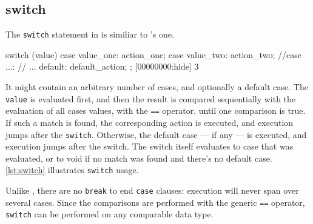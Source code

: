 \subsection{switch}

The \lstinline|switch| statement in \us is similiar to \C's one.

\begin{urbiscript}[frame=, backgroundcolor=, ]
switch (value)
{
  case value_one:
    action_one;
  case value_two:
    action_two;
//case ...:
//  ...
  default:
    default_action;
};
[00000000:hide] 3

\end{urbiscript}

It might contain an arbitrary number of cases, and optionally a
default case. The \lstinline|value| is evaluated first, and then the
result is compared sequentially with the evaluation of all cases
values, with the \lstinline|==| operator, until one comparison is
true. If such a match is found, the corresponding action is executed,
and execution jumps after the \lstinline|switch|. Otherwise, the
default case --- if any --- is executed, and execution jumps after the
switch. The switch itself evaluates to case that was evaluated, or to
void if no match was found and there's no default case. \autoref{lst:switch}
illustrates \lstinline|switch| usage.

Unlike \C, there are no \lstinline|break| to end \lstinline|case|
clauses: execution will never span over several cases.  Since the
comparisons are performed with the generic \lstinline|==| operator,
\lstinline|switch| can be performed on any comparable data type.


